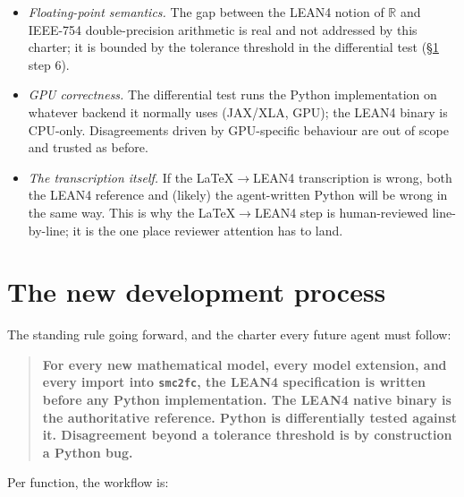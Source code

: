 \documentclass[11pt,a4paper]{article}
\begin{document}
\begin{itemize}
\item \emph{Floating-point semantics.} The gap between the LEAN4
  notion of $\mathbb{R}$ and IEEE-754 double-precision arithmetic
  is real and not addressed by this charter; it is bounded by the
  tolerance threshold in the differential test (§\ref{sec:process}
  step 6).
\item \emph{GPU correctness.} The differential test runs the
  Python implementation on whatever backend it normally uses
  (JAX/XLA, GPU); the LEAN4 binary is CPU-only. Disagreements
  driven by GPU-specific behaviour are out of scope and trusted
  as before.
\item \emph{The transcription itself.} If the LaTeX$\to$LEAN4
  transcription is wrong, both the LEAN4 reference and (likely)
  the agent-written Python will be wrong in the same way. This is
  why the LaTeX$\to$LEAN4 step is human-reviewed line-by-line; it
  is the one place reviewer attention has to land.
\end{itemize}

\section{The new development process}
\label{sec:process}

The standing rule going forward, and the charter every future
agent must follow:

\begin{quote}\bfseries
For every new mathematical model, every model extension, and every
import into \texttt{smc2fc}, the LEAN4 specification is written
before any Python implementation. The LEAN4 native binary is the
authoritative reference. Python is differentially tested against
it. Disagreement beyond a tolerance threshold is by construction a
Python bug.
\end{quote}

Per function, the workflow is:
\end{document}

